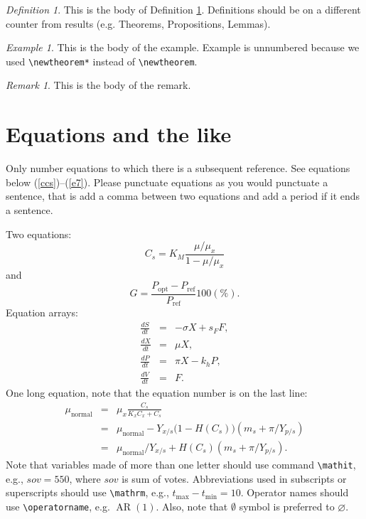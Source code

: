 \documentclass[qe,nameyear,draft]{econsocart}
\theoremstyle{plain}
\theoremstyle{remark}
\newtheorem{definition}{Definition}
\newtheorem*{example}{Example}
\newtheorem{remark}{Remark}
\begin{document}
\begin{definition}\label{de1}
This is the body of Definition \ref{de1}. Definitions should be on a different counter from results (e.g. Theorems, Propositions, Lemmas).
\end{definition}

\begin{example}
This is the body of the example. Example is unnumbered because we used \verb|\newtheorem*|
instead of \verb|\newtheorem|.
\end{example}

\begin{remark}
This is the body of the remark. 
\end{remark}

\section{Equations and the like}
Only number equations to which there is a subsequent reference.
See equations below (\ref{ccs})--(\ref{e7}). Please punctuate equations as you would punctuate a sentence, that is add a comma between two equations and add a period if it ends a sentence.

Two equations:
\begin{equation}
    C_{s}  =  K_{M} \frac{\mu/\mu_{x}}{1-\mu/\mu_{x}} \label{ccs}
\end{equation}
and
\begin{equation}
    G = \frac{P_{\mathrm{opt}} - P_{\mathrm{ref}}}{P_{\mathrm{ref}}}  100(\%).
\end{equation}
Equation arrays:
\begin{eqnarray}
  \frac{dS}{dt} & = & - \sigma X + s_{F} F,\\
  \frac{dX}{dt} & = &   \mu    X,\\
  \frac{dP}{dt} & = &   \pi    X - k_{h} P,\\
  \frac{dV}{dt} & = &   F.
\end{eqnarray}
One long equation, note that the equation number is on the last line:
\begin{eqnarray}
 \mu_{\text{normal}} & = & \mu_{x} \frac{C_{s}}{K_{x}C_{x}+C_{s}}  \nonumber\\
                     & = & \mu_{\text{normal}} - Y_{x/s}\bigl(1-H(C_{s})\bigr)(m_{s}+\pi /Y_{p/s})\nonumber\\
                     & = & \mu_{\text{normal}}/Y_{x/s}+ H(C_{s}) (m_{s}+ \pi /Y_{p/s}).\label{e7}
\end{eqnarray}
Note that variables made of more than one letter should use command \verb|\mathit|,
e.g., $\mathit{sov}=550$, where $\mathit{sov}$ is sum of votes. Abbreviations used in subscripts or superscripts should use \verb|\mathrm|,
e.g., $t_{\mathrm{max}}-t_{\mathrm{min}} =10$. Operator names should use \verb|\operatorname|, e.g. $\operatorname{AR}(1)$. Also, note that $\emptyset$ symbol is preferred to $\varnothing$.
\end{document}
